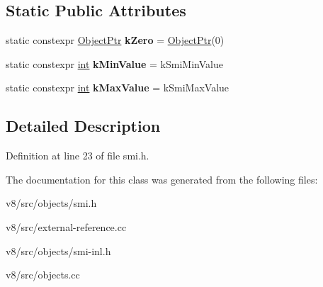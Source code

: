 \subsection*{Static Public Attributes}
\begin{DoxyCompactItemize}
\item 
\mbox{\label{classv8_1_1internal_1_1Smi_a17db2f1c78a2fd71092b4a8a2095fcae}} 
static constexpr \mbox{\hyperlink{classv8_1_1internal_1_1ObjectPtr}{Object\+Ptr}} {\bfseries k\+Zero} = \mbox{\hyperlink{classv8_1_1internal_1_1ObjectPtr}{Object\+Ptr}}(0)
\item 
\mbox{\label{classv8_1_1internal_1_1Smi_ad72b2b9d2e785017f29dfbcf54475491}} 
static constexpr \mbox{\hyperlink{classint}{int}} {\bfseries k\+Min\+Value} = k\+Smi\+Min\+Value
\item 
\mbox{\label{classv8_1_1internal_1_1Smi_af3d26aa8c5407775428f36ef82bfaf3c}} 
static constexpr \mbox{\hyperlink{classint}{int}} {\bfseries k\+Max\+Value} = k\+Smi\+Max\+Value
\end{DoxyCompactItemize}


\subsection{Detailed Description}


Definition at line 23 of file smi.\+h.



The documentation for this class was generated from the following files\+:\begin{DoxyCompactItemize}
\item 
v8/src/objects/smi.\+h\item 
v8/src/external-\/reference.\+cc\item 
v8/src/objects/smi-\/inl.\+h\item 
v8/src/objects.\+cc\end{DoxyCompactItemize}
